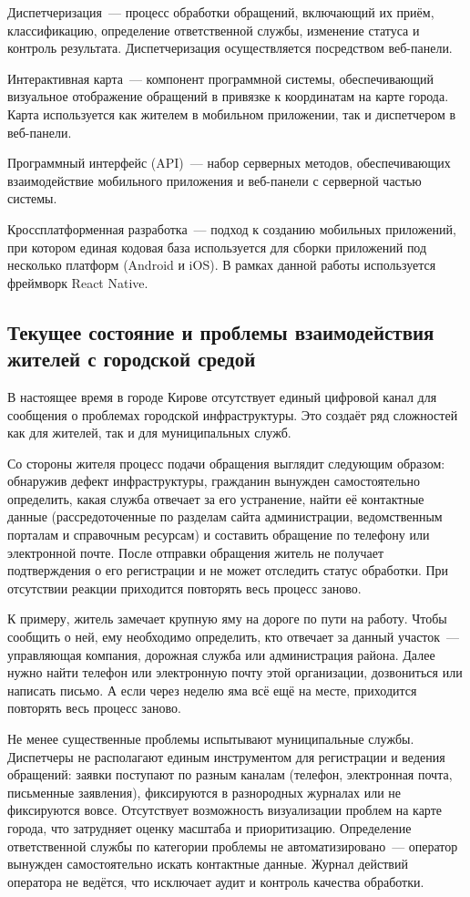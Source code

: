 Диспетчеризация~--- процесс обработки обращений, включающий их приём, классификацию, определение ответственной службы, изменение статуса и контроль результата. Диспетчеризация осуществляется посредством веб-панели.

Интерактивная карта~--- компонент программной системы, обеспечивающий визуальное отображение обращений в привязке к координатам на карте города. Карта используется как жителем в мобильном приложении, так и диспетчером в веб-панели.

Программный интерфейс (API)~--- набор серверных методов, обеспечивающих взаимодействие мобильного приложения и веб-панели с серверной частью системы.

Кроссплатформенная разработка~--- подход к созданию мобильных приложений, при котором единая кодовая база используется для сборки приложений под несколько платформ (Android и iOS). В рамках данной работы используется фреймворк React Native.

\subsection{Текущее состояние и проблемы взаимодействия жителей с городской средой}

В настоящее время в городе Кирове отсутствует единый цифровой канал для сообщения о проблемах городской инфраструктуры. Это создаёт ряд сложностей как для жителей, так и для муниципальных служб.

Со стороны жителя процесс подачи обращения выглядит следующим образом: обнаружив дефект инфраструктуры, гражданин вынужден самостоятельно определить, какая служба отвечает за его устранение, найти её контактные данные (рассредоточенные по разделам сайта администрации, ведомственным порталам и справочным ресурсам) и составить обращение по телефону или электронной почте. После отправки обращения житель не получает подтверждения о его регистрации и не может отследить статус обработки. При отсутствии реакции приходится повторять весь процесс заново.

К примеру, житель замечает крупную яму на дороге по пути на работу. Чтобы сообщить о ней, ему необходимо определить, кто отвечает за данный участок~--- управляющая компания, дорожная служба или администрация района. Далее нужно найти телефон или электронную почту этой организации, дозвониться или написать письмо. А если через неделю яма всё ещё на месте, приходится повторять весь процесс заново.

Не менее существенные проблемы испытывают муниципальные службы. Диспетчеры не располагают единым инструментом для регистрации и ведения обращений: заявки поступают по разным каналам (телефон, электронная почта, письменные заявления), фиксируются в разнородных журналах или не фиксируются вовсе. Отсутствует возможность визуализации проблем на карте города, что затрудняет оценку масштаба и приоритизацию. Определение ответственной службы по категории проблемы не автоматизировано~--- оператор вынужден самостоятельно искать контактные данные. Журнал действий оператора не ведётся, что исключает аудит и контроль качества обработки.

